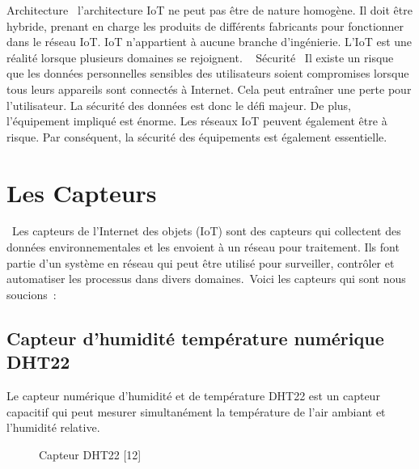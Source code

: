 Architecture \newline l’architecture IoT ne peut pas être de nature homogène. Il doit être hybride, prenant en charge les produits de différents fabricants pour fonctionner dans le réseau IoT. IoT n’appartient à aucune branche d’ingénierie. L’IoT est une réalité lorsque plusieurs domaines se rejoignent.\newline  
Sécurité \newline Il existe un risque que les données personnelles sensibles des utilisateurs soient compromises lorsque tous leurs appareils sont connectés à Internet. Cela peut entraîner une perte pour l’utilisateur. La sécurité des données est donc le défi majeur. De plus, l’équipement impliqué est énorme. Les réseaux IoT peuvent également être à risque. Par conséquent, la sécurité des équipements est également essentielle.
\section{Les Capteurs}
 Les capteurs de l'Internet des objets (IoT) sont des capteurs qui collectent des données environnementales et les envoient à un réseau pour traitement. Ils font partie d'un système en réseau qui peut être utilisé pour surveiller, contrôler et automatiser les processus dans divers domaines. Voici les capteurs qui sont nous soucions :
\subsection{Capteur d'humidité température numérique DHT22}
Le capteur numérique d'humidité et de température DHT22 est un capteur capacitif qui peut mesurer simultanément la température de l'air ambiant et l'humidité relative. 
\begin{figure}[hbt]
\centering
\label{fig:Capteur DHT22}


 \caption{Capteur DHT22 [12]}
\end{figure}
